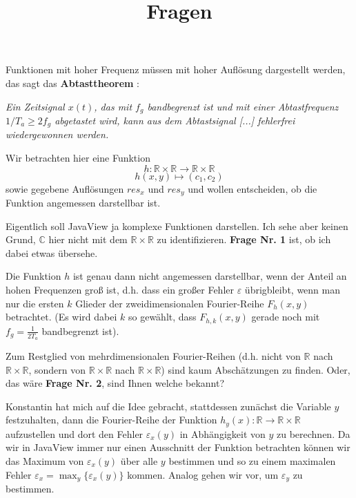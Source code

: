 \documentclass[a4paper]{article}
\begin{document}
\title{Fragen}
\date{}
\maketitle
\thispagestyle{empty}
\setlength{\parskip}{6pt}

Funktionen mit hoher Frequenz müssen mit hoher Auflösung dargestellt werden, das sagt das \textbf{Abtasttheorem} \cite[nach][]{MuellerWichards1999}:

\textit{Ein Zeitsignal $x(t)$, das mit $f_g$ bandbegrenzt ist und mit einer Abtastfrequenz $1/T_a \geq 2 f_g$ abgetastet wird, kann aus dem Abtastsignal [...] fehlerfrei wiedergewonnen werden.}

Wir betrachten hier eine Funktion $$h: \mathbb{R} \times \mathbb{R} \rightarrow \mathbb{R} \times \mathbb{R}$$
$$h(x,y) \mapsto (c_1,c_2)$$ sowie gegebene Auflösungen $res_x$ und $res_y$  und wollen entscheiden, ob die Funktion angemessen darstellbar ist.

Eigentlich soll JavaView ja komplexe Funktionen darstellen. Ich sehe aber keinen Grund, $\mathbb{C}$ hier nicht mit dem $\mathbb{R} \times \mathbb{R}$ zu identifizieren. \textbf{Frage Nr. 1} ist, ob ich dabei etwas übersehe.

Die Funktion $h$ ist genau dann nicht angemessen darstellbar, wenn der Anteil an hohen Frequenzen groß ist, d.h. dass ein großer Fehler $\varepsilon$ übrigbleibt, wenn man nur die ersten $k$ Glieder der zweidimensionalen Fourier-Reihe $F_h(x,y)$ betrachtet. (Es wird dabei $k$ so gewählt, dass $F_{h,k}(x,y)$ gerade noch mit $f_g=\frac{1}{2T_a}$ bandbegrenzt ist).

Zum Restglied von mehrdimensionalen Fourier-Reihen (d.h. nicht von $\mathbb{R}$ nach $\mathbb{R} \times \mathbb{R}$, sondern von $\mathbb{R} \times \mathbb{R}$ nach $\mathbb{R} \times \mathbb{R}$) sind kaum Abschätzungen zu finden. Oder, das wäre \textbf{Frage Nr. 2}, sind Ihnen welche bekannt?

Konstantin hat mich auf die Idee gebracht, stattdessen zunächst die Variable $y$ festzuhalten, dann die Fourier-Reihe der Funktion $h_{y}(x): \mathbb{R} \rightarrow \mathbb{R} \times \mathbb{R}$ aufzustellen und dort den Fehler $\varepsilon_x(y)$ in Abhängigkeit von $y$ zu berechnen. Da wir in JavaView immer nur einen Ausschnitt der Funktion betrachten können wir das Maximum von $\varepsilon_x(y)$ über alle $y$ bestimmen und so zu einem maximalen Fehler $\varepsilon_x=\max_y \{ \varepsilon_x(y) \}$ kommen. Analog gehen wir vor, um $\varepsilon_y$ zu bestimmen.
\end{document}
